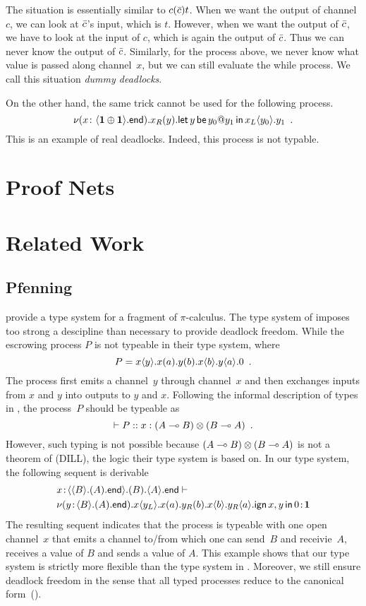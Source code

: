 The situation is essentially similar to $c(\bar{c})t$.
When we want the output of channel $c$, we can look at $\bar{c}$'s input,
which is $t$.  However, when we want the output of $\bar{c}$, we have to
look at the input of $c$, which is again the output of $\bar{c}$.  Thus we
can never know the output of $\bar{c}$.
Similarly, for the process above, we never know what value is passed
along channel~$x$, but we can still evaluate the while process.
We call this situation \textit{dummy deadlocks}.

On the other hand,
the same trick cannot be used for the following process.
\[
 \nu(x\colon \langle{\mathbf{1}\oplus\mathbf{1}}\rangle.{\mathsf{end}}).
 {{x_R}({y}).{\mathsf{let }\,{y}\,\mathsf{ be }\,{y_0@y_1}\,\mathsf{ in }\,{{x_L}\langle{y_0}\rangle.{y_1}}}}\enspace.
\]
This is an example of real deadlocks.
Indeed, this process is not typable.

\section{Proof Nets}


\section{Related Work}

\subsection{Pfenning}

\citet{pfenning2010} provide a type system for a fragment of $\pi$-calculus.
The type system of \citet{pfenning2010} imposes too strong a descipline
than necessary to provide deadlock freedom.
While the escrowing process $P$ is not typeable in their type
system, where
\[
 P = {x}\langle{y}\rangle.{{{x}({a}).{{{y}({b}).{{x}\langle{b}\rangle.{{y}\langle{a}\rangle.{0}}}}}}}\enspace.
\]
The process first emits a channel~$y$ through channel~$x$ and then
exchanges inputs from $x$ and $y$ into outputs to $y$ and $x$.
Following the informal description of types in \citep{pfenning2010},
the process~$P$ should be typeable as
\[
 \vdash P::x:(A\multimap B)\otimes(B\multimap A)\enspace.
\]
However, such typing is not possible because $(A\multimap B)\otimes (B\multimap
A)$ is not a theorem of  (DILL), the logic their type system
is based on.
In our type system, the following sequent is derivable
\begin{align*}
&
{x} \mathord{\colon\kern -2pt}{\langle{\langle{B}\rangle.{(A).{\mathsf{end}}}}\rangle.{(B).{\langle{A}\rangle.{\mathsf{end}}}}}
\vdash\\
&{
\nu({y} \mathord{\colon\kern -2pt}{\langle{B}\rangle.{(A).{\mathsf{end}}}}).
{{x}\langle{y_L}\rangle.{{{x}({a}).{{{y_R}({b}).{{x}\langle{b}\rangle.{{y_R}\langle{a}\rangle.{\mathsf{ign }\,{x,y}\,\mathsf{ in }\,{0}}}}}}}}}
} \mathord{\colon\kern -2pt}{\mathbf{1}}
\end{align*}
The resulting sequent indicates that the process is typeable with one
open channel~$x$ that emits
a channel to/from which one can send~$B$ and receivie~$A$, receives a
value of $B$ and
sends a value of $A$.
This example shows that our type system is strictly more flexible than
the type system in \citet{pfenning2010}.
Moreover, we still ensure deadlock freedom in the sense that all typed
processes reduce to the canonical form~().

